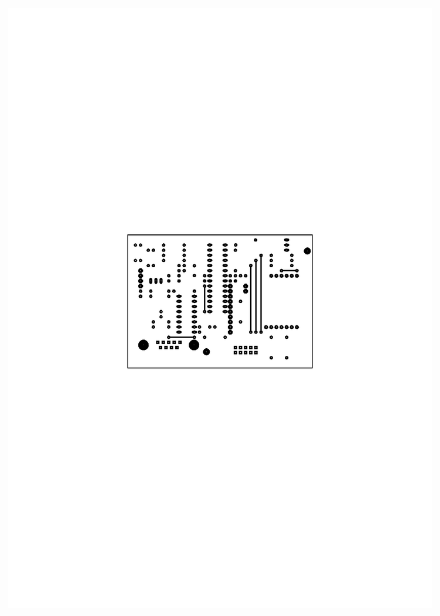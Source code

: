\documentclass[paper=a4, parskip, numbers=noenddot, toc=listof, headsepline]{scrbook}
\begin{document}
			\begin{figure}
				\centering
				\includegraphics[scale=1]{Bilder/Transmittertop}\vspace{5mm}\\

\end{figure}
\end{document}
